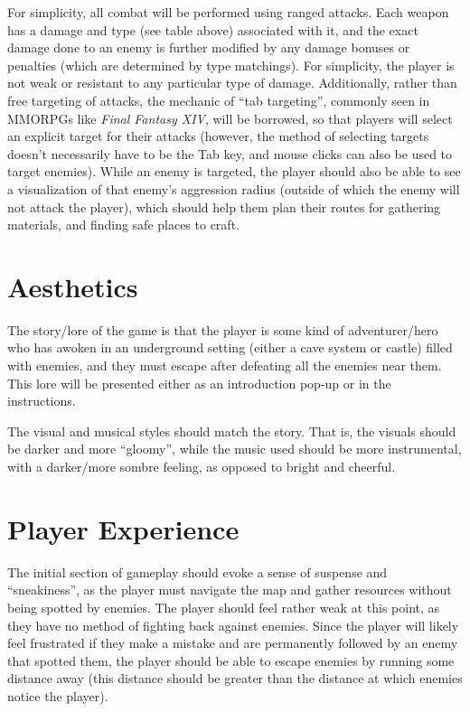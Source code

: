 \documentclass[10pt]{article}
\begin{document}
For simplicity, all combat will be performed using ranged attacks. Each weapon has a damage and type (see table above)
associated with it, and the exact damage done to an enemy is further modified by any damage bonuses or penalties
(which are determined by type matchings). For simplicity, the player is not weak or resistant to any particular type of damage.
Additionally, rather than free targeting of attacks, the mechanic of ``tab targeting'', commonly seen in MMORPGs like \textit{Final Fantasy XIV},
will be borrowed, so that players will select an explicit target for their attacks (however, the method of selecting targets doesn't
necessarily have to be the Tab key, and mouse clicks can also be used to target enemies). While an enemy is targeted,
the player should also be able to see a visualization of that enemy's aggression radius (outside of which the enemy will not attack the player),
which should help them plan their routes for gathering materials, and finding safe places to craft.

\section{Aesthetics}

The story/lore of the game is that the player is some kind of adventurer/hero who has awoken in an underground setting (either a cave system
or castle) filled with enemies, and they must escape after defeating all the enemies near them. This lore will be presented
either as an introduction pop-up or in the instructions.

The visual and musical styles should match the story. That is, the visuals should be darker and more ``gloomy'',
while the music used should be more instrumental, with a darker/more sombre feeling, as opposed to bright and cheerful.

\pagebreak

\section{Player Experience}

The initial section of gameplay should evoke a sense of suspense and ``sneakiness'', as the player must navigate the map
and gather resources without being spotted by enemies. The player should feel rather weak at this point, as they have no
method of fighting back against enemies. Since the player will likely feel frustrated if they make a mistake and are permanently
followed by an enemy that spotted them, the player should be able to escape enemies by running some distance away (this distance
should be greater than the distance at which enemies notice the player).
\end{document}
